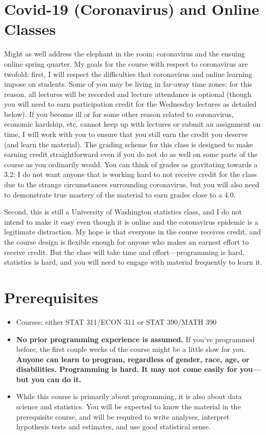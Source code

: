 \documentclass[12pt]{article}
\begin{document}
\section*{Covid-19 (Coronavirus) and Online Classes}

Might as well address the elephant in the room: coronavirus and the ensuing online spring quarter. My goals for the course with respect to coronavirus are twofold: first, I will respect the difficulties that coronavirus and online learning impose on students. Some of you may be living in far-away time zones; for this reason, all lectures will be recorded and lecture attendance is optional (though you will need to earn participation credit for the Wednesday lectures as detailed below). If you become ill or for some other reason related to coronavirus, economic hardship, etc. cannot keep up with lectures or submit an assignment on time, I will work with you to ensure that you still earn the credit you deserve (and learn the material). The grading scheme for this class is designed to make earning credit straightforward even if you do not do as well on some parts of the course as you ordinarily would. You can think of grades as gravitating towards a 3.2: I do not want anyone that is working hard to not receive credit for the class due to the strange circumstances surrounding coronavirus, but you will also need to demonstrate true mastery of the material to earn grades close to a 4.0.

Second, this is still a University of Washington statistics class, and I do not intend to make it easy even though it is online and the coronavirus epidemic is a legitimate distraction. My hope is that everyone in the course receives credit, and the course design is flexible enough for anyone who makes an earnest effort to receive credit. But the class will take time and effort---programming is hard, statistics is hard, and you will need to engage with material frequently to learn it.

\section*{Prerequisites}

\begin{itemize}
	\item Courses: either STAT 311/ECON 311 or STAT 390/MATH 390
	\item \textbf{No prior programming experience is assumed.} If you've programmed before, the first couple weeks of the course might be a little slow for you. \textbf{Anyone can learn to program, regardless of gender, race, age, or disabilities. Programming is hard. It may not come easily for you---but you can do it.}
	\item While this course is primarily about programming, it is also about data science and statistics. You will be expected to know the material in the prerequisite course, and will be required to write analyses, interpret hypothesis tests and estimates, and use good statistical sense.
\end{itemize}
\end{document}
